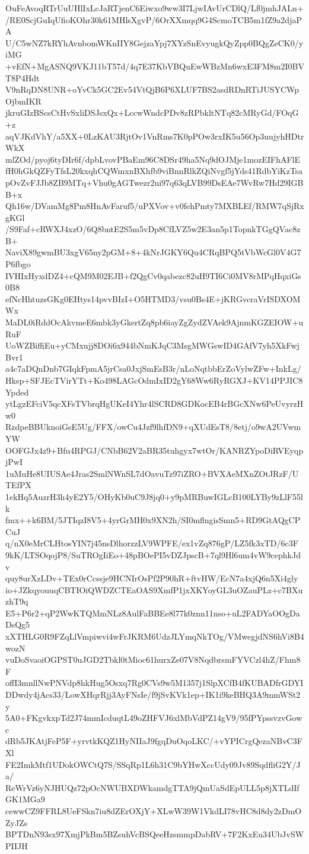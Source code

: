 OuFeAvoqRTrUuUHlIxLcJaRTjenC6Eiwxo9ww3I7LjwIAvUrCDlQ/Lf0jmhJALn+
/RE0ScjGuIqUfioKOhr30k61MHlsXgvP/6OrXXmqq9G4ScmoTCB5m1fZ9a2djaPA
U/C5wNZ7kRYhAvnbomWKnIIY8GejzaYpj7XYzSnEvyugkQyZpp0BQgZeCK0/yiMG
+vEfN+MgASNQ9VKJ11bT57d/4q7E37KbVBQuEwWBzMn6wxE3FM8m2I0BVT8P4Hdt
V9nRqDN8UNR+oYvCk5GC2Ev54VtQjB6P6XLUF7BS2asdRDnRTiJUSYCWpOjbmIKR
jkruGIzBScsCtHvSxliDSJsxQx+LccwWndcPDv8zRPbkltNTq82cMRyGd/FOqG+z
aqVJKdVhY/a5XX+0LzKAU3RjtOv1VnRms7K0pPOw3rxIK5u56Op3uujyhHDtrWkX
mlZOd/pyoj6tyDIr6f/dpbLvovPBaEm96C8DSr49ha5Nq9dOJMje1mozEIFhAFlE
fH0hGkQZFyTfsL20kxqhCQWmxnBXhfb9viBnnRlkZQiNvgf5jYds41RdbYiKzTsa
pOvZvFJJb8ZB9MTq+Vhu0gAGTwezr2ui97q63qLVB99DsEAe7WvRw7Hd29IGBB+x
Qh16w/DVamMg8Pm8HnAvFaruf5/uPXVov+v0fehPmty7MXBLEf/RMW7qSjRxgKGl
/S9Faf+cRWXJ4xzO/6Q8bntE2S5m5vDp8CfLVZ5w2E3an5p1TopnkTGgQVac8zB+
NaviX89gwmBU3xgV65ny2pGM+8+4kNrJGKY6Qu4CRqBPQ5tVbWcGl0V4G7P6fbgo
IVHIxHyxdDZ4+cQM9M02EJB+f2QgCv0qabezc82uH9TI6Ci0MV8rMPqHqxiGs0B8
efNcHhtuzsGKg0EHtys14pvvBIzI+O5HTMD3/vsu0Bs4E+jKRGvcraVrISDXOMWx
MaDL0iRddOcAkvmeE6mbk3yGkertZq8pb6iayZgZydZVAek9AjnmKGZEIOW+uRuF
UoWZBiffiEu+yCMxujj8DOi6x944bNmKJqC3MsgMWGswID4GAfV7yh5XkFwjBvr1
a4c7aDQnDnb7GIqkFpmA5jrCsa0JxjSmEsB3r/nLoNqtbbErZoVylwZFw+InkLg/
Hksp+SFJEcTVirYTt+Ko498LAGcOdmIxID2gY68Ww6RyRGXJ+KV14PPJIC8Ypded
ytLgzEFciV5qcXFsTVbrqHgUKeI4Yhr4lSCRD8GDKocEB4rBGcXNw6PeUvyrzHw0
RzdpeBBUknoiGsE5Ug/FFX/owCu4Jzf9lhfDN9+qXUdEsT8/8etj/o9wA2UVwmYW
OOFGJx4z9+Bfu4RPGJ/CNbB62V2aBR35tuhgyx7wtOr/KANRZYpoDiRVEyqpjPwI
1uMuHe8UIUSAe4Jras2SmlNWnSL7dOavuTz97iZRO+BVXAeMXnZOtJRzF/UTEfPX
1ekHq5AuzrH3h4yE2Y5/OHyKb0uC9J8jq0+y9pMRBuwIGLcB100LYBy9zLlF55lk
fmx++k6BM/5JTIqzI8V5+4yrGrMH0x9XN2h/SI0mflngisSmn5+RD9GtAQgCPCuJ
q/nX0eMrCLHtosYIN7j45nsDlhorzzLV9WPFE/ex1vZq876gP/LZ5fk3xTD/6c3F
9kK/LTSOqojP8/SuTROgIiEo+48pBOePI5vDZJpscB+7ql9Hl6um4vW9cephkJdv
quy8urXzLDv+TEx0rCcssje9HCNIrOsPf2P90hR+ftvHW/EcN7a4xjQ6n5Xi4gly
io+JZkqyouuqCBTIOiQWDZCTEaOAS9XmfP1jxXKYoyGL3uOZauPLz+c7BXuzhT9q
E5+P6r2+qP2WwKTQMmNLz8AulFaBBEe8l77k0znn11nso+uL2FADYaOOgDaDsQg5
xXTHLG0R9FZqLlVmpiwvi4wFrJKRM6UdzJLYmqNkTOg/VMwegjdNS6hVi8B4wozN
vuDoSvaoiOGPST0uJGD2Tbkl0tMioc61hurxZe07V8NqdbrsmFYVCzl4hZ/Fhm8F
offI3mnllNwPNVdp8hkHug5Osxq7Rg0CVs9w5M1357j1SlpXCfB4fKUBADfrGDYI
DDwdy4jAcs33/LowXHqrRjj3AyFNsIe/f9jSvKVk1ep+IK1i9keBHQ3A9mmWSt2y
5A0+FKgvkxpTd2J74mmIcduqtL49oZHFVJ6xlMbVdPZ14gV9/95fPYpssvzvGowc
dRb5JKAtjFeP5F+yrvtkKQZ1HyNIIaJ9fgqDuOqoLKC/+vYPICrgQezaNBvC3FXl
FE2ImkMtf1UDokOWCtQ7S/SSqRp1L6h31C9bYHwXccUdy09Jv89SqdfliG2Y/Ja/
ReWrVz6yNJHUQz72pOcNWUBXDWkamdgTTA9jQmUaSdEpULL5p8jXTLdIfGK1MGa9
cewwCZ9FFRL8UeFSkn7iu8dZErOXjY+XLwW39W1VkdLI78vHC8d8dy2zDmOZyJZs
BPTDnN93sx97XmjPkBm5BZsuhVcBSQeeHzsmmpDabRV+7F2KxEu34UbJvSWPIIJH
